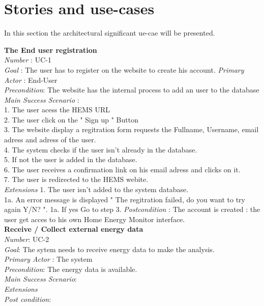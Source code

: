 \clearpage
\section{Stories and use-cases}

In this section the architectural significant ue-cae will be presented.




\textbf{The End user registration} \\
\textit{Number} : UC-1 \\
\textit{Goal} : The user has to register on the website to create his account.
\textit{Primary Actor }:  End-User \\
\textit{Precondition}: The website has the internal process to add an user to the database
\textit{Main Success Scenario }: \\
 1. The user acess the HEMS URL \\
 2. The user click on the " Sign up " Button \\
 3. The website display a regitration form requests the Fullname, Username, email adress and adress of the user.\\
 4. The system checks if the user isn't already in the database. \\
 5. If not the user is added in the database. \\
 6. The user receives a confirmation link on his email adress and clicks on it. \\ %
 7. The user is redirected to the HEMS webite. \\
\textit{Extensions} 1. The user isn't added to the system database. \\
1a. An error message is displayed " The regitration failed, do you want to try again Y/N? ".
1a. If yes Go to step 3.
\textit{Postcondition} : The account is created : the user get acces to his own Home Energy Monitor interface. \\

\textbf{Receive / Collect external energy data} \\%
\textit{Number}: UC-2 \\
\textit{Goal}: The sytem needs to receive energy data to make the analysis. \\
\textit{Primary Actor} : The system \\
\textit{Precondition}: The energy data is available. \\
\textit{Main Success Scenario}: \\ %
\textit{Extensions} \\
\textit{Post condition}: \\

